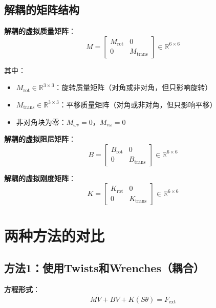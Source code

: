 \documentclass[12pt,a4paper]{article}
\begin{document}
\subsection{解耦的矩阵结构}

\textbf{解耦的虚拟质量矩阵}：
\begin{equation}
M = \begin{bmatrix}
M_{\text{rot}} & 0 \\
0 & M_{\text{trans}}
\end{bmatrix} \in \mathbb{R}^{6 \times 6}
\end{equation}

其中：
\begin{itemize}
\item $M_{\text{rot}} \in \mathbb{R}^{3 \times 3}$：旋转质量矩阵（对角或非对角，但只影响旋转）
\item $M_{\text{trans}} \in \mathbb{R}^{3 \times 3}$：平移质量矩阵（对角或非对角，但只影响平移）
\item 非对角块为零：$M_{\omega v} = 0$，$M_{v\omega} = 0$
\end{itemize}

\textbf{解耦的虚拟阻尼矩阵}：
\begin{equation}
B = \begin{bmatrix}
B_{\text{rot}} & 0 \\
0 & B_{\text{trans}}
\end{bmatrix} \in \mathbb{R}^{6 \times 6}
\end{equation}

\textbf{解耦的虚拟刚度矩阵}：
\begin{equation}
K = \begin{bmatrix}
K_{\text{rot}} & 0 \\
0 & K_{\text{trans}}
\end{bmatrix} \in \mathbb{R}^{6 \times 6}
\end{equation}

\section{两种方法的对比}

\subsection{方法1：使用Twists和Wrenches（耦合）}

\textbf{方程形式}：
\begin{equation}
M\dot{V} + BV + K(S\theta) = F_{\text{ext}}
\end{equation}
\end{document}
